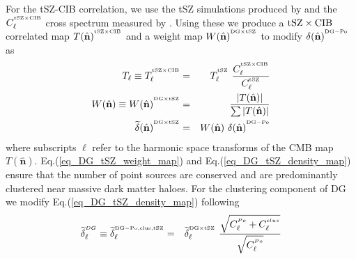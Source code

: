 For the tSZ-CIB correlation, we use the tSZ simulations produced by \cite{mccarthy2013} and the $C_{\ell}^{^{\rm tSZ \times CIB}}$ cross spectrum measured by \citet{george2015}. Using these we produce a $\rm tSZ \times CIB$ correlated map $T(\hat{\textbf{n}})^{^{\rm tSZ \times CIB}}$ and a weight map $W(\hat{\textbf{n}})^{^{\rm DG \times tSZ}}$ to modify $\delta(\hat{\textbf{n}})^{^{\rm DG-Po}}$ as
\begin{eqnarray}
T_{\ell} \equiv T_{\ell}^{^{\rm tSZ \times CIB}} & = & T_{\ell}^{^{\rm tSZ}}\ \frac{C_{\ell}^{^{\rm tSZ \times CIB}}}{C_{\ell}^{^{\rm tSZ}}}\\
\label{eq_DG_tSZ_weight_map}
W(\hat{\textbf{n}}) \equiv W(\hat{\textbf{n}})^{^{\rm DG \times tSZ}} & = & \frac{\left| T(\hat{\textbf{n}}) \right|}{\sum{\left|T(\hat{\textbf{n}})\right|}}\\
\label{eq_DG_tSZ_density_map}
\widetilde{\delta}(\hat{\textbf{n}})^{^{\rm DG \times tSZ}} & = & W(\hat{\textbf{n}})\ \delta(\hat{\textbf{n}})^{^{\rm DG-Po}}
\end{eqnarray} where subscripts $\ell$ refer to the harmonic space transforms of the CMB map $T(\hat{\textbf{n}})$. Eq.(\ref{eq_DG_tSZ_weight_map}) and Eq.(\ref{eq_DG_tSZ_density_map}) ensure that the number of point sources are conserved and are predominantly clustered near massive dark matter haloes. For the clustering component of DG we modify Eq.(\ref{eq_DG_tSZ_density_map}) following \cite{gonzalez2004}
\begin{eqnarray}
\widetilde{\delta}_{\ell}^{^{DG}} \equiv \widetilde{\delta}_{\ell}^{^{\rm DG-Po, clus, tSZ}} & = & \widetilde{\delta}_{\ell}^{^{\rm DG \times tSZ}}\ \frac{ \sqrt{ C_{\ell}^{^{Po}} + C_{\ell}^{^{clus}}} } { \sqrt{ C_{\ell}^{^{Po}} } }
\end{eqnarray}